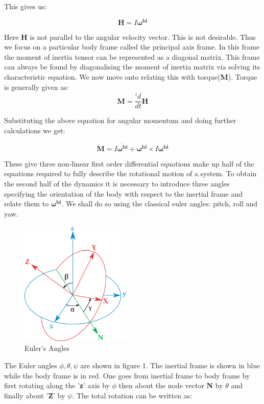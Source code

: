 \documentclass[12pt, letterpaper]{article}
\begin{document}
This gives us:

\begin{displaymath}
\mathbf{H} = I \mathbf{\omega^{bi}}
\end{displaymath}

Here \textbf{H} is not parallel to the angular velocity vector. This is not desirable. Thus we focus on a particular body frame called the principal axis frame. In this frame the moment of inertia tensor can be represented as a diagonal matrix. This frame can always be found by diagonalising the moment of inertia matrix via solving its characteristic equation. We now move onto relating this with torque(\textbf{M}). Torque is generally given as:
\begin{displaymath}
\mathbf{M} = \frac{{}^id}{dt}\mathbf{H}
\end{displaymath}

Substituting the above equation for angular momentum and doing further calculations we get:

\begin{displaymath}
\mathbf{M} = I\dot{\mathbf{\omega^{bi}}} + \mathbf{\omega^{bi}}\times I \mathbf{\omega^{bi}}
\end{displaymath}

These give three non-linear first order differential equations make up half of the equations required to fully describe the rotational motion of a system. To obtain the second half of the dynamics it is necessary to introduce three angles specifying the orientation of the body with respect to the inertial frame and relate them to $\mathbf{\omega^{bi}}$. We shall do so using the classical euler angles: pitch, roll and yaw.

\begin{figure}[h]
	\centering
    \includegraphics[width = 200px]{EulerAngles}
    \caption{Euler's Angles}
\end{figure}

The Euler angles $\phi,\theta,\psi$ are shown in figure 1. The inertial frame is shown in blue while the body frame is in red. One goes from inertial frame to body frame by first rotating along the '\textbf{z}' axis by $\phi$ then about the node vector \textbf{N} by $\theta$ and finally about '\textbf{Z}' by $\psi$. The total rotation can be written as:
\end{document}
